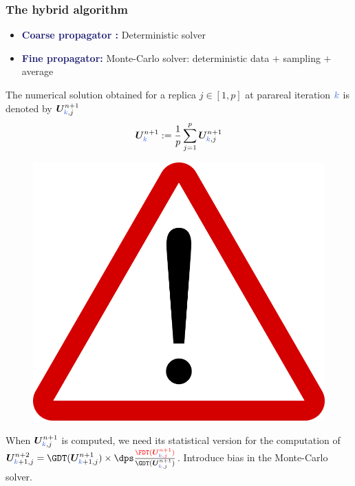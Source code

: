 \documentclass[aspectratio=169]{beamer}
\begin{document}
\begin{frame}
  \frametitle{The hybrid algorithm}
  \begin{itemize}
  \item
    \textcolor{midnightblue}{\textbf{Coarse propagator :}} Deterministic solver
  \item
\textcolor{midnightblue}{\textbf{Fine propagator:}} Monte-Carlo solver: deterministic data $+$ sampling $+$ average    
    \end{itemize}
\vspace*{0.2 cm}
The numerical solution obtained for a replica $j \in \left[1, p\right]$ at parareal iteration $\kk$ is denoted by ${\bm U}_{\kk,j}^{n+1}$
\begin{equation*}
{\bm U}_{\kk}^{n+1} := \frac{1}{p} \sum_{j=1}^p {\bm U}_{\kk,j}^{n+1}
\end{equation*}
\begin{minipage}{0.2 \linewidth}
\begin{figure}
\includegraphics[scale=0.04]{image/attention}
\end{figure}
\end{minipage}
\hfill
\begin{minipage}{0.75 \linewidth}
  When ${\bm U}_{\kk,j}^{n+1}$ is computed, we need its statistical version for the computation of ${\bm U}_{\kk+1,j}^{n+2} = \GDT({\bm U}_{\kk+1,j}^{n+1}) \times \dps \frac{\textcolor{red}{\FDT({\bm U}_{\kk,j}^{n+1})}}{\GDT({\bm U}_{\kk,j}^{n+1})}$.
  Introduce bias in the Monte-Carlo solver.
\end{minipage}
\end{frame}
\end{document}
